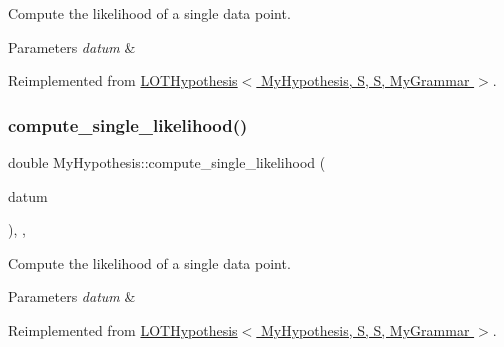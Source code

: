 Compute the likelihood of a single data point. 


\begin{DoxyParams}{Parameters}
{\em datum} & \\
\hline
\end{DoxyParams}


Reimplemented from \hyperlink{class_l_o_t_hypothesis_a0ff11e5e328fcfa819a8dd9b5d57bd65}{L\+O\+T\+Hypothesis$<$ My\+Hypothesis, S, S, My\+Grammar $>$}.

\mbox{\label{class_my_hypothesis_a480fc9e50d0faa0f5226f56187fd2eec}} 
\subsubsection{\texorpdfstring{compute\+\_\+single\+\_\+likelihood()}{compute\_single\_likelihood()}\hspace{0.1cm}{\footnotesize\ttfamily [3/4]}}
{\footnotesize\ttfamily double My\+Hypothesis\+::compute\+\_\+single\+\_\+likelihood (\begin{DoxyParamCaption}\item[{const \hyperlink{class_bayesable_a9f1a6c0cd7855550fa10b1a8f13a5867}{datum\+\_\+t} \&}]{datum }\end{DoxyParamCaption})\hspace{0.3cm}{\ttfamily [inline]}, {\ttfamily [override]}, {\ttfamily [virtual]}}



Compute the likelihood of a single data point. 


\begin{DoxyParams}{Parameters}
{\em datum} & \\
\hline
\end{DoxyParams}


Reimplemented from \hyperlink{class_l_o_t_hypothesis_a0ff11e5e328fcfa819a8dd9b5d57bd65}{L\+O\+T\+Hypothesis$<$ My\+Hypothesis, S, S, My\+Grammar $>$}.

\mbox{\label{class_my_hypothesis_af2470b1e04711c06ee551deae15af4c1}} 
